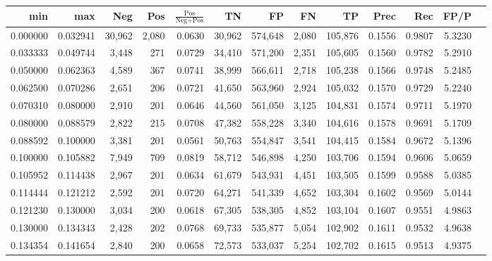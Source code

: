 \begin{tabular}{rrrrrrrrrrrrr}
\toprule
     min &      max &    Neg &   Pos & $\frac{\text{Pos}}{\text{Neg}+\text{Pos}}$ &      TN &      FP &      FN &      TP &   Prec &    Rec &   FP/P \\
\midrule
0.000000 & 0.032941 & 30,962 & 2,080 &                                     0.0630 &  30,962 & 574,648 &   2,080 & 105,876 & 0.1556 & 0.9807 & 5.3230 \\
0.033333 & 0.049744 &  3,448 &   271 &                                     0.0729 &  34,410 & 571,200 &   2,351 & 105,605 & 0.1560 & 0.9782 & 5.2910 \\
0.050000 & 0.062363 &  4,589 &   367 &                                     0.0741 &  38,999 & 566,611 &   2,718 & 105,238 & 0.1566 & 0.9748 & 5.2485 \\
0.062500 & 0.070286 &  2,651 &   206 &                                     0.0721 &  41,650 & 563,960 &   2,924 & 105,032 & 0.1570 & 0.9729 & 5.2240 \\
0.070310 & 0.080000 &  2,910 &   201 &                                     0.0646 &  44,560 & 561,050 &   3,125 & 104,831 & 0.1574 & 0.9711 & 5.1970 \\
0.080000 & 0.088579 &  2,822 &   215 &                                     0.0708 &  47,382 & 558,228 &   3,340 & 104,616 & 0.1578 & 0.9691 & 5.1709 \\
0.088592 & 0.100000 &  3,381 &   201 &                                     0.0561 &  50,763 & 554,847 &   3,541 & 104,415 & 0.1584 & 0.9672 & 5.1396 \\
0.100000 & 0.105882 &  7,949 &   709 &                                     0.0819 &  58,712 & 546,898 &   4,250 & 103,706 & 0.1594 & 0.9606 & 5.0659 \\
0.105952 & 0.114438 &  2,967 &   201 &                                     0.0634 &  61,679 & 543,931 &   4,451 & 103,505 & 0.1599 & 0.9588 & 5.0385 \\
0.114444 & 0.121212 &  2,592 &   201 &                                     0.0720 &  64,271 & 541,339 &   4,652 & 103,304 & 0.1602 & 0.9569 & 5.0144 \\
0.121230 & 0.130000 &  3,034 &   200 &                                     0.0618 &  67,305 & 538,305 &   4,852 & 103,104 & 0.1607 & 0.9551 & 4.9863 \\
0.130000 & 0.134343 &  2,428 &   202 &                                     0.0768 &  69,733 & 535,877 &   5,054 & 102,902 & 0.1611 & 0.9532 & 4.9638 \\
0.134354 & 0.141654 &  2,840 &   200 &                                     0.0658 &  72,573 & 533,037 &   5,254 & 102,702 & 0.1615 & 0.9513 & 4.9375 \\

\end{tabular}
